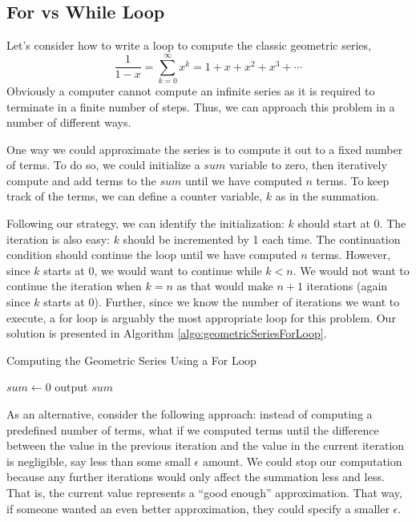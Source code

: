 \subsection{For vs While Loop}

Let's consider how to write a loop to compute the classic geometric series, 
  $$\frac{1}{1-x} = \sum_{k=0}^\infty x^k = 1 + x + x^2 + x^3 + \cdots$$
Obviously a computer cannot compute an infinite series as it is required to 
terminate in a finite number of steps.  Thus, we can approach this problem in
a number of different ways.  

One way we could approximate the series is to compute it out to a fixed
number of terms.  To do so, we could initialize a $sum$ variable to zero, then 
iteratively compute and add terms to the $sum$ until we have computed $n$ 
terms.  To keep track of the terms, we can define a counter variable, $k$ as in 
the summation.  

Following our strategy, we can identify the initialization: $k$ should start at $0$.
The iteration is also easy: $k$ should be incremented by 1 each time.  The 
continuation condition should continue the loop until we have computed $n$ terms.
However, since $k$ starts at 0, we would want to continue while $k < n$.  We
would not want to continue the iteration when $k = n$ as that would make $n + 1$
iterations (again since $k$ starts at 0).  Further, since we know the number of
iterations we want to execute, a for loop is arguably the most appropriate loop
for this problem.  Our solution is presented in Algorithm \ref{algo:geometricSeriesForLoop}.

\begin{algorithm}[h]
\caption{Computing the Geometric Series Using a For Loop}
\label{algo:geometricSeriesForLoop}
$sum \leftarrow 0$ \;
output $sum$ \;
\end{algorithm}

As an alternative, consider the following approach: instead of computing a 
predefined number of terms, what if we computed terms until the difference
between the value in the previous iteration and the value in the current 
iteration is negligible, say less than some small $\epsilon$ amount.  We could
stop our computation because any further iterations would only affect the 
summation less and less.  That is, the current value represents a ``good
enough'' approximation.  That way, if someone wanted an even better
approximation, they could specify a smaller $\epsilon$.

